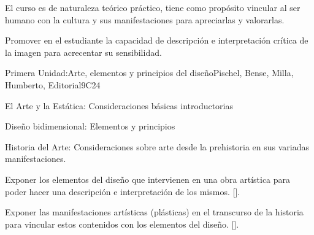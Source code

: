 \begin{syllabus}


\begin{justification}
El curso es de naturaleza teórico práctico, tiene como propósito vincular al ser humano con la cultura y sus manifestaciones para apreciarlas y valorarlas.
\end{justification}

\begin{goals}
\item Promover en el estudiante la capacidad de descripción e interpretación crítica de la imagen para acrecentar su sensibilidad.
\end{goals}

\begin{outcomes}
    \item {}
\end{outcomes}
\begin{competences}
    \item {}
\end{competences}

\begin{unit}{}{Primera Unidad:Arte, elementos y principios del diseño}{Pischel, Bense, Milla, Humberto, Editorial}{9}{C24}
\begin{topics}
	\item El Arte y la Estática: Consideraciones básicas introductorias
	\item Diseño bidimensional: Elementos y principios
	\item Historia del Arte: Consideraciones sobre arte desde la  prehistoria en sus variadas manifestaciones.
\end{topics}
\begin{learningoutcomes}
	\item Exponer los elementos del diseño que intervienen en una obra artística para poder hacer una descripción e interpretación de los mismos. [\Usage].
	\item Exponer las manifestaciones artísticas (plásticas) en el transcurso de la historia para vincular estos contenidos con los elementos del diseño. [\Usage].

\end{learningoutcomes}
\end{unit}


\end{syllabus}
